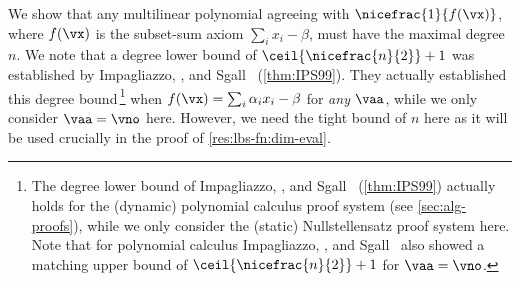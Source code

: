 \documentclass[11pt]{article}
\numberwithin{equation}{section}
\theoremstyle{definition}
\theoremstyle{plain}
\begin{document}
We show that any multilinear polynomial agreeing with $\nicefrac{1}{f(\vx)}$, where $f(\vx)$ is the subset-sum axiom $\sum_i x_i-\beta$, must have the maximal degree $n$.  We note that a degree lower bound of $\ceil{\nicefrac{n}{2}}+1$ was established by Impagliazzo, \Pudlak, and Sgall~\cite{IPS99} (\autoref{thm:IPS99}).  They actually established this degree bound\,\footnote{The degree lower bound of Impagliazzo, \Pudlak, and Sgall~\cite{IPS99} (\autoref{thm:IPS99}) actually holds for the (dynamic) polynomial calculus proof system (see \autoref{sec:alg-proofs}), while we only consider the (static) Nullstellensatz proof system here.  Note that for polynomial calculus Impagliazzo, \Pudlak, and Sgall~\cite{IPS99} also showed a matching upper bound of $\ceil{\nicefrac{n}{2}}+1$ for $\vaa=\vno$.}  when $f(\vx)=\sum_i \alpha_i x_i-\beta$ for \emph{any} $\vaa$, while we only consider $\vaa=\vno$ here.  However, we need the tight bound of $n$ here as it will be used crucially in the proof of \autoref{res:lbs-fn:dim-eval}.
\end{document}
